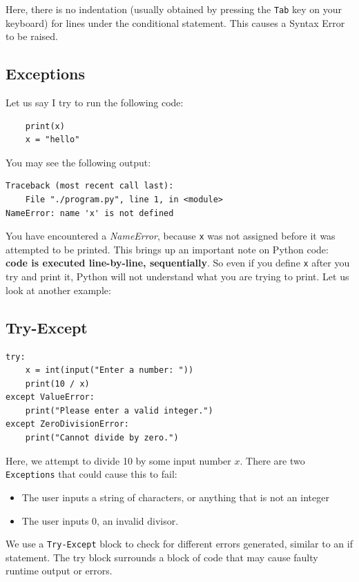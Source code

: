 Here, there is no indentation (usually obtained by pressing the \verb|Tab| key on your keyboard) for lines under the conditional statement. This causes a Syntax Error to be raised.
\subsection{Exceptions}
Let us say I try to run the following code:

\begin{verbatim}
    print(x)
    x = "hello"
\end{verbatim}

You may see the following output:
\begin{verbatim}
Traceback (most recent call last):
    File "./program.py", line 1, in <module>
NameError: name 'x' is not defined
\end{verbatim}

You have encountered a \emph{NameError}, because \texttt{x} was not assigned before it was attempted to be printed. This brings up an important note on Python code: \textbf{code is executed line-by-line, sequentially}. So even if you define \texttt{x} after you try and print it, Python will not understand what you are trying to print. Let us look at another example:

\subsection{Try-Except}
\begin{verbatim}
try:
    x = int(input("Enter a number: "))
    print(10 / x)
except ValueError:
    print("Please enter a valid integer.")
except ZeroDivisionError:
    print("Cannot divide by zero.")
\end{verbatim}
Here, we attempt to divide 10 by some input number $x$. There are two \texttt{Exceptions} that could cause this to fail:
\begin{itemize}
    \item The user inputs a string of characters, or anything that is not an integer
    \item The user inputs 0, an invalid divisor.
\end{itemize}
We use a \texttt{Try-Except} block to check for different errors generated, similar to an if statement. The try block surrounds a block of code that may cause faulty runtime output or errors. 

